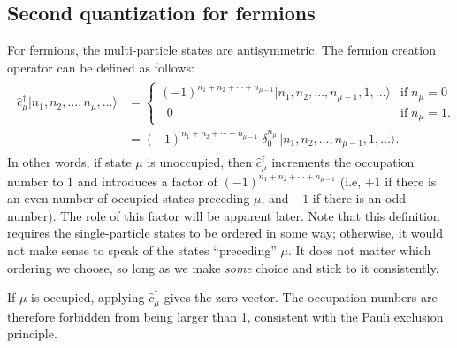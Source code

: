 \documentclass[prx,12pt]{revtex4-2}
\begin{document}
\subsection{Second quantization for fermions}
\label{sec:second_quantized_fermions}

For fermions, the multi-particle states are antisymmetric.  The
fermion creation operator can be defined as follows:
\begin{align}
  \begin{aligned}\hat{c}_\mu^\dagger |n_1, n_2, \dots, n_\mu,\dots\rangle &= \begin{cases}(-1)^{n_1 + n_2 + \cdots + n_{\mu-1}} |n_1, n_2, \dots, n_{\mu-1}, 1, \dots\rangle & \mathrm{if} \; n_\mu = 0 \\ \;\;0 & \mathrm{if}\; n_\mu = 1.
    \end{cases} \\&= (-1)^{n_1 + n_2 + \cdots + n_{\mu-1}}\; \delta^{n_\mu}_0\, \big|n_1, n_2, \dots, n_{\mu-1}, 1, \dots\big\rangle. \end{aligned}
  \label{fermiondef}
\end{align}
In other words, if state $\mu$ is unoccupied, then
$\hat{c}_\mu^\dagger$ increments the occupation number to 1 and
introduces a factor of $(-1)^{n_1 + n_2 + \cdots + n_{\mu-1}}$ (i.e,
$+1$ if there is an even number of occupied states preceding $\mu$,
and $-1$ if there is an odd number).  The role of this factor will be
apparent later.  Note that this definition requires the
single-particle states to be ordered in some way; otherwise, it would
not make sense to speak of the states ``preceding'' $\mu$.  It does
not matter which ordering we choose, so long as we make \textit{some}
choice and stick to it consistently.

If $\mu$ is occupied, applying $\hat{c}_\mu^\dagger$ gives the zero
vector.  The occupation numbers are therefore forbidden from being
larger than 1, consistent with the Pauli exclusion principle.
\end{document}
